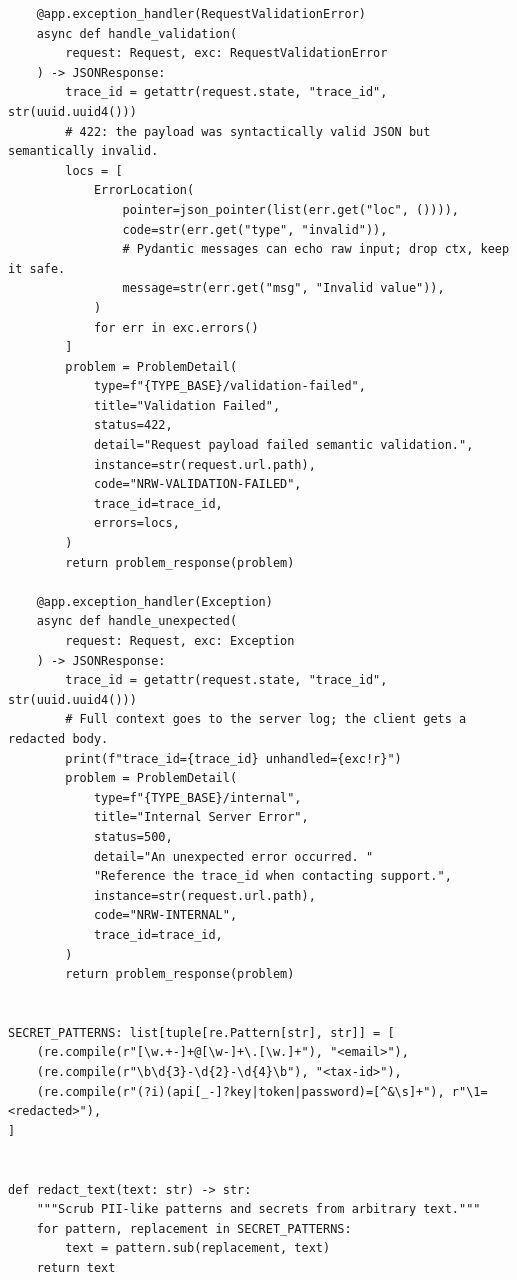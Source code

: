 \begin{verbatim}
    @app.exception_handler(RequestValidationError)
    async def handle_validation(
        request: Request, exc: RequestValidationError
    ) -> JSONResponse:
        trace_id = getattr(request.state, "trace_id", str(uuid.uuid4()))
        # 422: the payload was syntactically valid JSON but semantically invalid.
        locs = [
            ErrorLocation(
                pointer=json_pointer(list(err.get("loc", ()))),
                code=str(err.get("type", "invalid")),
                # Pydantic messages can echo raw input; drop ctx, keep it safe.
                message=str(err.get("msg", "Invalid value")),
            )
            for err in exc.errors()
        ]
        problem = ProblemDetail(
            type=f"{TYPE_BASE}/validation-failed",
            title="Validation Failed",
            status=422,
            detail="Request payload failed semantic validation.",
            instance=str(request.url.path),
            code="NRW-VALIDATION-FAILED",
            trace_id=trace_id,
            errors=locs,
        )
        return problem_response(problem)

    @app.exception_handler(Exception)
    async def handle_unexpected(
        request: Request, exc: Exception
    ) -> JSONResponse:
        trace_id = getattr(request.state, "trace_id", str(uuid.uuid4()))
        # Full context goes to the server log; the client gets a redacted body.
        print(f"trace_id={trace_id} unhandled={exc!r}")
        problem = ProblemDetail(
            type=f"{TYPE_BASE}/internal",
            title="Internal Server Error",
            status=500,
            detail="An unexpected error occurred. "
            "Reference the trace_id when contacting support.",
            instance=str(request.url.path),
            code="NRW-INTERNAL",
            trace_id=trace_id,
        )
        return problem_response(problem)


SECRET_PATTERNS: list[tuple[re.Pattern[str], str]] = [
    (re.compile(r"[\w.+-]+@[\w-]+\.[\w.]+"), "<email>"),
    (re.compile(r"\b\d{3}-\d{2}-\d{4}\b"), "<tax-id>"),
    (re.compile(r"(?i)(api[_-]?key|token|password)=[^&\s]+"), r"\1=<redacted>"),
]


def redact_text(text: str) -> str:
    """Scrub PII-like patterns and secrets from arbitrary text."""
    for pattern, replacement in SECRET_PATTERNS:
        text = pattern.sub(replacement, text)
    return text
\end{verbatim}

